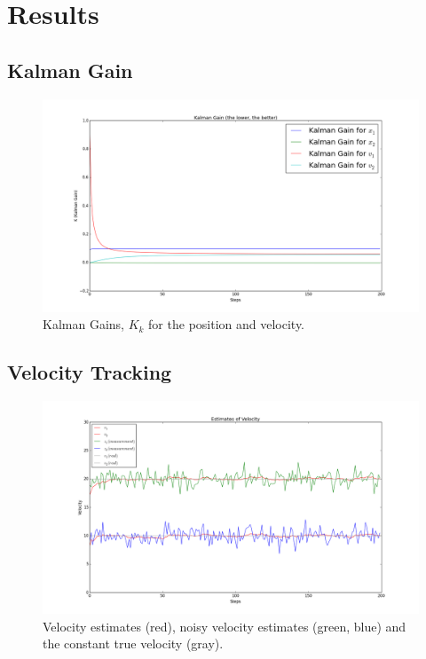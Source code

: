 \documentclass{article}
\begin{document}
\section{Results}

\subsection{Kalman Gain}

\begin{figure}[H]
  \includegraphics[width=\linewidth]{kalman_gains.png}
  \caption{Kalman Gains, $K_k$ for the position and velocity.}
  \label{fig:m2}
\end{figure}


\subsection{Velocity Tracking}

\begin{figure}[H]
  \includegraphics[width=\linewidth]{velocity_states_tracking.png}
  \caption{Velocity estimates (red), noisy velocity estimates (green, blue) and the constant true velocity (gray).}
  \label{fig:m3}
\end{figure}
\end{document}
